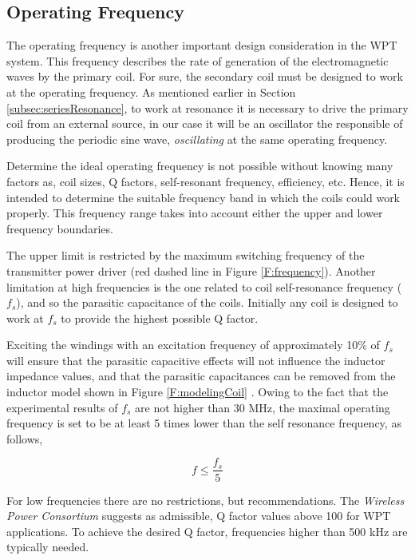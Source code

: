		\subsection{Operating Frequency} \label{subsec:operatingFreq}
The operating frequency is another important design consideration in the WPT system. This frequency describes the rate of generation of the electromagnetic waves by the primary coil. For sure, the secondary coil must be designed to work at the operating frequency. As mentioned earlier in Section \ref{subsec:seriesResonance}, to work at resonance it is necessary to drive the primary coil from an external source, in our case it will be an oscillator the responsible of producing the periodic sine wave, \textit{oscillating} at the same operating frequency.

Determine the ideal operating frequency is not possible without knowing many factors as, coil sizes, Q factors, self-resonant frequency, efficiency, etc. Hence, it is intended to determine the suitable frequency band in which the coils could work properly. This frequency range takes into account either the upper and lower frequency boundaries. 

The upper limit is restricted by the maximum switching frequency of the transmitter power driver (red dashed line in Figure \ref{F:frequency}). Another limitation at high frequencies is the one related to coil self-resonance frequency ($f_s$), and so the parasitic capacitance of the coils. Initially any coil is designed to work at $f_s$ to provide the highest possible Q factor. 

Exciting the windings with an excitation frequency of approximately 10$\%$ of $f_s$ will ensure that the parasitic capacitive effects will not influence the inductor impedance values, and that the parasitic capacitances can be removed from the inductor model shown in Figure \ref{F:modelingCoil} \cite{tesis}. Owing to the fact that the experimental results of $f_s$ are not higher than 30 MHz, the maximal operating frequency is set to be at least 5 times lower than the self resonance frequency, as follows,

\begin{equation}\label{eq:maxop}
f\leq\frac{f_s}{5}
\end{equation}

For low frequencies there are no restrictions, but recommendations. The \textit{Wireless Power Consortium} suggests as admissible, Q factor values above 100 for WPT applications. To achieve the desired Q factor, frequencies higher than 500 kHz are typically needed.

